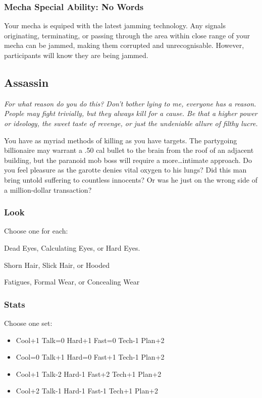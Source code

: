 \subsubsection{Mecha Special Ability: No Words}
Your mecha is equiped with the latest jamming technology. Any signals originating, terminating, or passing through the area within close range of your mecha can be jammed, making them corrupted and unrecognisable. However, participants will know they are being jammed.



\subsection{Assassin}
{\itshape For what reason do you do this? Don't bother lying to me,
  everyone has a reason. People may fight trivially, but they always
  kill for a cause. Be that a higher power or ideology, the sweet
  taste of revenge, or just the undeniable allure of filthy lucre.

You have as myriad methods of killing as you have targets. The
partygoing billionaire may warrant a .50 cal bullet to the brain from
the roof of an adjacent building, but the paranoid mob boss will
require a more\ldots intimate approach. Do you feel pleasure as the
garotte denies vital oxygen to his lungs? Did this man bring untold
suffering to countless innocents? Or was he just on the wrong side of
a million-dollar transaction?}

\subsubsection{Look}
Choose one for each:

Dead Eyes, Calculating Eyes, or Hard Eyes.

Shorn Hair, Slick Hair, or Hooded

Fatigues, Formal Wear, or Concealing Wear

\subsubsection{Stats}
Choose one set:
\begin{itemize}
\setlength\itemsep{0em}
\item Cool+1 Talk=0 Hard+1 Fast=0 Tech-1 Plan+2
\item Cool=0 Talk+1 Hard=0 Fast+1 Tech-1 Plan+2
\item Cool+1 Talk-2 Hard-1 Fast+2 Tech+1 Plan+2
\item Cool+2 Talk-1 Hard-1 Fast-1 Tech+1 Plan+2
\end{itemize}

